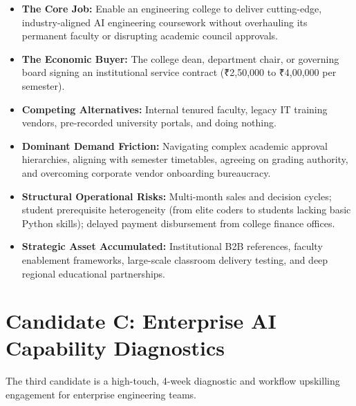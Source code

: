 \begin{itemize}[leftmargin=12pt,itemsep=1pt,topsep=1pt]
  \item \textbf{The Core Job:} Enable an engineering college to deliver cutting-edge, industry-aligned AI engineering coursework without overhauling its permanent faculty or disrupting academic council approvals.
  \item \textbf{The Economic Buyer:} The college dean, department chair, or governing board signing an institutional service contract (₹2,50,000 to ₹4,00,000 per semester).
  \item \textbf{Competing Alternatives:} Internal tenured faculty, legacy IT training vendors, pre-recorded university portals, and doing nothing.
  \item \textbf{Dominant Demand Friction:} Navigating complex academic approval hierarchies, aligning with semester timetables, agreeing on grading authority, and overcoming corporate vendor onboarding bureaucracy.
  \item \textbf{Structural Operational Risks:} Multi-month sales and decision cycles; student prerequisite heterogeneity (from elite coders to students lacking basic Python skills); delayed payment disbursement from college finance offices.
  \item \textbf{Strategic Asset Accumulated:} Institutional B2B references, faculty enablement frameworks, large-scale classroom delivery testing, and deep regional educational partnerships.
\end{itemize}

\section{Candidate C: Enterprise AI Capability Diagnostics}

The third candidate is a high-touch, 4-week diagnostic and workflow upskilling engagement for enterprise engineering teams.

